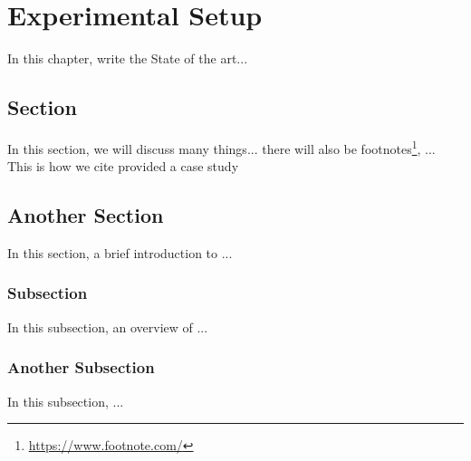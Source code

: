 \chapter{Experimental Setup}
\label{cha:exs}
\vspace{0.4 cm}

In this chapter, write the State of the art...


\section{Section}
\label{sec:data}
\vspace{0.2 cm}

In this section, we will discuss many things... there will also be footnotes\footnote{ \url{https://www.footnote.com/} }, ...
This is how we cite\cite{Nguyen2019} provided a case study

\section{Another Section}
\label{sec:timeseries}
\vspace{0.2 cm}

In this section, a brief introduction to ... 

\vspace{0.1 cm}
\subsection{Subsection}
\label{sec:transformers}
\vspace{0.1 cm}

In this subsection, an overview of ...

\vspace{0.1 cm}
\subsection{Another Subsection}
\label{sec:automl}
\vspace{0.1 cm}

In this subsection, ...